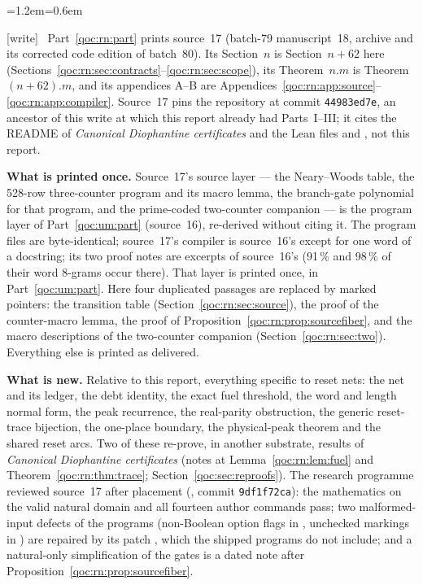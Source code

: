 \documentclass[11pt,letterpaper]{article}
\theoremstyle{definition}
\theoremstyle{remark}
\newcommand{\wtag}{\textup{[write]}}
\newenvironment{writenote}{\par\smallskip\begin{list}{}{\leftmargin=1.2em\rightmargin=0.6em}\item[]\small\wtag\ }{\end{list}\smallskip}
\begin{document}
\begin{writenote}
Part~\ref{qoc:rn:part} prints source~17 (batch-79 manuscript~18, archive  and its corrected code edition of batch~80). Its Section~$n$ is Section~$n+62$ here (Sections~\ref{qoc:rn:sec:contracts}--\ref{qoc:rn:sec:scope}), its Theorem~$n.m$ is Theorem~$(n+62).m$, and its appendices A--B are Appendices~\ref{qoc:rn:app:source}--\ref{qoc:rn:app:compiler}. Source~17 pins the repository at commit \texttt{44983ed7e}, an ancestor of this write at which this report already had Parts~I--III; it cites the README of \emph{Canonical Diophantine certificates} and the Lean files  and , not this report.

\textbf{What is printed once.} Source~17's source layer --- the Neary--Woods table, the 528-row three-counter program and its macro lemma, the branch-gate polynomial for that program, and the prime-coded two-counter companion --- is the program layer of Part~\ref{qoc:um:part} (source~16), re-derived without citing it. The program files are byte-identical; source~17's compiler  is source~16's  except for one word of a docstring; its two proof notes are excerpts of source~16's (91\,\% and 98\,\% of their word 8-grams occur there). That layer is printed once, in Part~\ref{qoc:um:part}. Here four duplicated passages are replaced by marked pointers: the transition table (Section~\ref{qoc:rn:sec:source}), the proof of the counter-macro lemma, the proof of Proposition~\ref{qoc:rn:prop:sourcefiber}, and the macro descriptions of the two-counter companion (Section~\ref{qoc:rn:sec:two}). Everything else is printed as delivered.

\textbf{What is new.} Relative to this report, everything specific to reset nets: the net and its ledger, the debt identity, the exact fuel threshold, the word and length normal form, the peak recurrence, the real-parity obstruction, the generic reset-trace bijection, the one-place boundary, the physical-peak theorem and the shared reset arcs. Two of these re-prove, in another substrate, results of \emph{Canonical Diophantine certificates} (notes at Lemma~\ref{qoc:rn:lem:fuel} and Theorem~\ref{qoc:rn:thm:trace}; Section~\ref{qoc:sec:reproofs}). The research programme reviewed source~17 after placement (, commit \texttt{9df1f72ca}): the mathematics on the valid natural domain and all fourteen author commands pass; two malformed-input defects of the programs (non-Boolean option flags in , unchecked markings in ) are repaired by its patch , which the shipped programs do not include; and a natural-only simplification of the gates is a dated note after Proposition~\ref{qoc:rn:prop:sourcefiber}.
\end{writenote}
\end{document}
